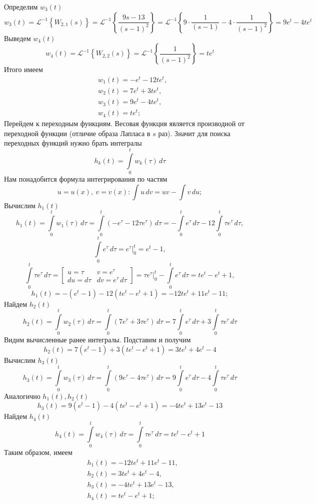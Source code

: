 \documentclass[a4paper, 12pt]{article}
\begin{document}
    Определим $w_3(t)$
    $$
    w_3(t)=\mathcal{L}^{-1}\left\{ W_{2,1}(s) \right\}=\mathcal{L}^{-1}\left\{ \dfrac{9s-13}{\left( s-1 \right)^2} \right\}=\mathcal{L}^{-1}\left\{ 9\cdot\dfrac{1}{\left( s-1 \right)}-4\cdot\dfrac{1}{\left( s-1 \right)^2} \right\}=9e^t-4te^t
    $$
    Выведем $w_4(t)$
    $$
    w_4(t)=\mathcal{L}^{-1}\left\{ W_{2,2}(s) \right\}=\mathcal{L}^{-1}\left\{ \dfrac{1}{\left( s-1 \right)^2} \right\}=te^t
    $$
    Итого имеем
    \begin{align*}
        &w_1(t)=-e^t-12te^t,\\
        &w_2(t)=7e^t+3te^t,\\
        &w_3(t)=9e^t-4te^t,\\
        &w_4(t)=te^t;
    \end{align*}
    Перейдем к переходным функциям. Весовая функция является производной от переходной
    функции (отличие образа Лапласа в $s$ раз). Значит для поиска переходных функций нужно брать интегралы
    $$
    h_k(t)=\int\limits_{0}^{t}w_k(\tau)\,d\tau
    $$
    Нам понадобится формула интегрирования по частям
    $$
    u=u(x),\ v=v(x):\int u\,dv=uv-\int v\,du;
    $$
    Вычислим $h_1(t)$
    $$
    h_1(t)=\int\limits_{0}^{t}w_1(\tau)\,d\tau=\int\limits_{0}^{t}\left(-e^\tau-12\tau e^\tau\right)\,d\tau=
    -\int\limits_{0}^{t}e^\tau\,d\tau-12\int\limits_{0}^{t}\tau e^\tau\,d\tau,
    $$
    $$
    \int\limits_{0}^{t}e^\tau\,d\tau=e^\tau \big|_{0}^{t}=e^t-1,
    $$
    $$
    \int\limits_{0}^{t}\tau e^\tau\,d\tau=\begin{bmatrix}
        u=\tau &v=e^\tau\\
        du=d\tau &dv=e^\tau\,d\tau
    \end{bmatrix}=\tau e^\tau \big|_{0}^t-\int\limits_{0}^{t}e^\tau\,d\tau=
    te^t-e^t+1,
    $$
    $$
    h_1(t)=-\left( e^t-1 \right)-12\left( te^t-e^t+1 \right)=-12te^t+11e^t-11;
    $$
    Найдем $h_2(t)$
    $$
    h_2(t)=\int\limits_0^t w_2(\tau)\,d\tau=\int\limits_0^t \left( 7e^\tau+3\tau e^\tau\right)\,d\tau=
    7\int\limits_0^t e^\tau\,d\tau+3\int\limits_0^t \tau e^\tau\,d\tau
    $$
    Видим вычисленные ранее интегралы. Подставим и получим
    $$
    h_2(t)=7\left( e^t-1 \right)+3\left( te^t-e^t+1 \right)=3te^t+4e^t-4
    $$
    Вычислим $h_3(t)$
    $$
    h_3(t)=\int\limits_{0}^t w_3(\tau)\,d\tau=\int\limits_{0}^t \left(9e^\tau-4\tau e^\tau\right)\,d\tau=9\int\limits_{0}^t e^\tau\,d\tau-4\int\limits_{0}^t \tau e^\tau\,d\tau
    $$
    Аналогично $h_1(t),h_2(t)$
    $$
    h_3(t)=9\left( e^t-1 \right)-4\left( te^t-e^t+1 \right)=-4te^t+13e^t-13
    $$
    Найдем $h_4(t)$
    $$
    h_4(t)=\int\limits_0^t w_4(\tau)\,d\tau=\int\limits_0^t \tau e^\tau\,d\tau=te^t-e^t+1
    $$
    Таким образом, имеем
    \begin{align*}
        &h_1(t)=-12te^t+11e^t-11,\\
        &h_2(t)=3te^t+4e^t-4,\\
        &h_3(t)=-4te^t+13e^t-13,\\
        &h_4(t)=te^t-e^t+1;
    \end{align*}
\end{document}
